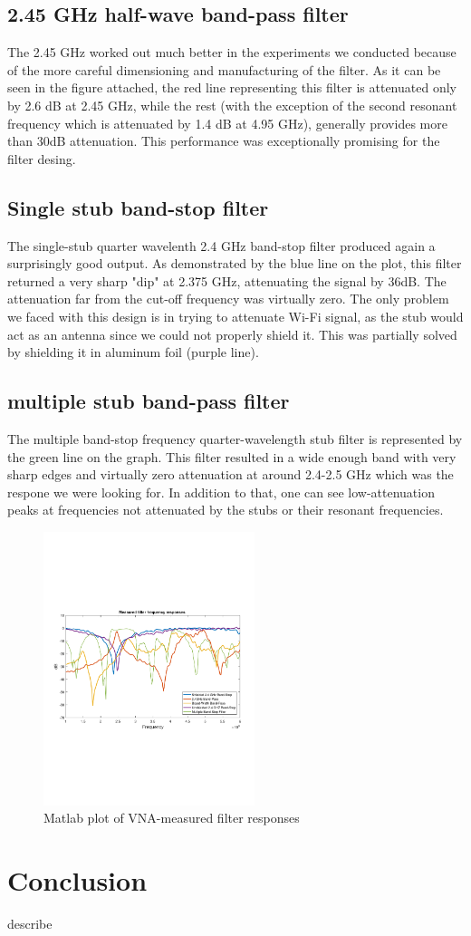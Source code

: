 \documentclass[letterpaper, 11pt, twocolumn]{article}
\begin{document}
\subsection{2.45 GHz half-wave band-pass filter}
The 2.45 GHz worked out much better in the experiments we conducted because of the more careful dimensioning and manufacturing of the filter. As it can be seen in the figure attached, the red line representing this filter is attenuated only by 2.6 dB at 2.45 GHz, while the rest (with the exception of the second resonant frequency which is attenuated by 1.4 dB at 4.95 GHz), generally provides more than 30dB attenuation. This performance was exceptionally promising for the filter desing.  


\subsection{Single stub band-stop filter}
The single-stub quarter wavelenth 2.4 GHz band-stop filter produced again a surprisingly good output. As demonstrated by the blue line on the plot, this filter returned a very sharp "dip" at 2.375 GHz, attenuating the signal by 36dB. The attenuation far from the cut-off frequency was virtually zero. The only problem we faced with this design is in trying to attenuate Wi-Fi signal, as the stub would act as an antenna since we could not properly shield it. This was partially solved by shielding it in aluminum foil (purple line). 

\subsection{multiple stub band-pass filter}
The multiple band-stop frequency quarter-wavelength stub filter is represented by the green line on the graph. This filter resulted in a wide enough band with very sharp edges and virtually zero attenuation at around 2.4-2.5 GHz which was the respone we were looking for. In addition to that, one can see low-attenuation peaks at frequencies not attenuated by the stubs or their resonant frequencies. 

\begin{figure}[H]
    \centering
    \includegraphics[trim={0.5cm, 7.8cm, 0.2cm, 8cm}, clip=true, width=0.55\textwidth]{graph.pdf}
    \caption{Matlab plot of VNA-measured filter responses}
\end{figure}
\section{Conclusion}
describe
\end{document}

